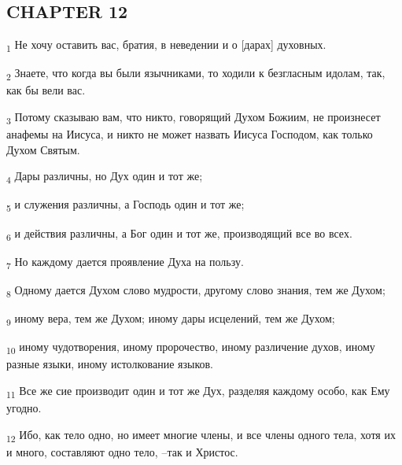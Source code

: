 \subsection{CHAPTER 12}
\begin{tcolorbox}
\textsubscript{1} Не хочу оставить вас, братия, в неведении и о [дарах] духовных.
\end{tcolorbox}
\begin{tcolorbox}
\textsubscript{2} Знаете, что когда вы были язычниками, то ходили к безгласным идолам, так, как бы вели вас.
\end{tcolorbox}
\begin{tcolorbox}
\textsubscript{3} Потому сказываю вам, что никто, говорящий Духом Божиим, не произнесет анафемы на Иисуса, и никто не может назвать Иисуса Господом, как только Духом Святым.
\end{tcolorbox}
\begin{tcolorbox}
\textsubscript{4} Дары различны, но Дух один и тот же;
\end{tcolorbox}
\begin{tcolorbox}
\textsubscript{5} и служения различны, а Господь один и тот же;
\end{tcolorbox}
\begin{tcolorbox}
\textsubscript{6} и действия различны, а Бог один и тот же, производящий все во всех.
\end{tcolorbox}
\begin{tcolorbox}
\textsubscript{7} Но каждому дается проявление Духа на пользу.
\end{tcolorbox}
\begin{tcolorbox}
\textsubscript{8} Одному дается Духом слово мудрости, другому слово знания, тем же Духом;
\end{tcolorbox}
\begin{tcolorbox}
\textsubscript{9} иному вера, тем же Духом; иному дары исцелений, тем же Духом;
\end{tcolorbox}
\begin{tcolorbox}
\textsubscript{10} иному чудотворения, иному пророчество, иному различение духов, иному разные языки, иному истолкование языков.
\end{tcolorbox}
\begin{tcolorbox}
\textsubscript{11} Все же сие производит один и тот же Дух, разделяя каждому особо, как Ему угодно.
\end{tcolorbox}
\begin{tcolorbox}
\textsubscript{12} Ибо, как тело одно, но имеет многие члены, и все члены одного тела, хотя их и много, составляют одно тело, --так и Христос.
\end{tcolorbox}
